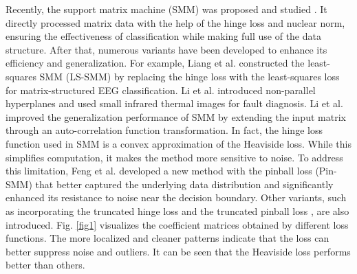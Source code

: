 \documentclass[sn-mathphys]{JORSC-jnl}%
\theoremstyle{thmstyleone}%
\theoremstyle{thmstylethree}%
\theoremstyle{thmstyleone} %
\begin{document}
Recently, the support matrix machine (SMM) was proposed and studied \cite{luo2015support}. 
It directly processed matrix data with the help of the hinge loss and nuclear norm, ensuring the effectiveness of classification while making full use of the data structure. 
After that, numerous variants have been developed to enhance its efficiency and generalization.
For example, Liang et al. \cite{liang2022adaptive} constructed the least-squares SMM (LS-SMM) by replacing the hinge loss with the least-squares loss for matrix-structured EEG classification. 
Li et al. \cite{li2022highly} introduced non-parallel hyperplanes and used small infrared thermal images for fault diagnosis. 
Li et al. \cite{li2022auto} improved the generalization performance of SMM by extending the input matrix through an auto-correlation function transformation.
In fact, the hinge loss function used in SMM is a convex approximation of the Heaviside loss. While this simplifies computation, it makes the method more sensitive to noise. 
To address this limitation, Feng et al. \cite{feng2022support} developed a new method with the pinball loss (Pin-SMM) that better captured the underlying data distribution and significantly enhanced its resistance to noise near the decision boundary.
Other variants, such as incorporating the truncated hinge loss \cite{qian2019robust} and the truncated pinball loss \cite{li2024support}, are also introduced.
Fig. \ref{fig1} visualizes the coefficient matrices obtained by different loss functions. 
The more localized and cleaner patterns indicate that the loss can better suppress noise and outliers. 
It can be seen that the Heaviside loss performs better than others.
\end{document}
